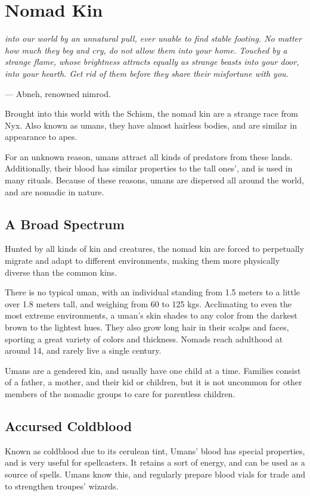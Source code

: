 \section{Nomad Kin} \label{kin::uman}
\textit{into our world by an unnatural pull, ever unable to find stable footing.
No matter how much they beg and cry, do not allow them into your home.
Touched by a strange flame, whose brightness attracts equally as strange beasts into your door, into your hearth.
Get rid of them before they share their misfortune with you.}

\hspace*{\fill} --- Abneh, renowned nimrod.

Brought into this world with the Schism, the nomad kin are a strange race from Nyx.
Also known as umans, they have almost hairless bodies, and are similar in appearance to apes.

For an unknown reason, umans attract all kinds of predators from these lands.
Additionally, their blood has similar properties to the tall ones', and is used in many rituals.
Because of these reasons, umans are dispersed all around the world, and are nomadic in nature.

\subsection*{A Broad Spectrum}
    Hunted by all kinds of kin and creatures, the nomad kin are forced to perpetually migrate and adapt to different environments, making them more physically diverse than the common kins.

    There is no typical uman, with an individual standing from 1.5 meters to a little over 1.8 meters tall, and weighing from 60 to 125 kgs.
    Acclimating to even the most extreme environments, a uman's skin shades to any color from the darkest brown to the lightest hues.
    They also grow long hair in their scalps and faces, sporting a great variety of colors and thickness.
    Nomads reach adulthood at around 14, and rarely live a single century.

    Umans are a gendered kin, and usually have one child at a time.
    Families consist of a father, a mother, and their kid or children, but it is not uncommon for other members of the nomadic groups to care for parentless children.

\subsection*{Accursed Coldblood}
    Known as coldblood due to its cerulean tint, Umans' blood has special properties, and is very useful for spellcasters.
    It retains a sort of energy, and can be used as a source of spells.
    Umans know this, and regularly prepare blood vials for trade and to strengthen troupes' wizards.

